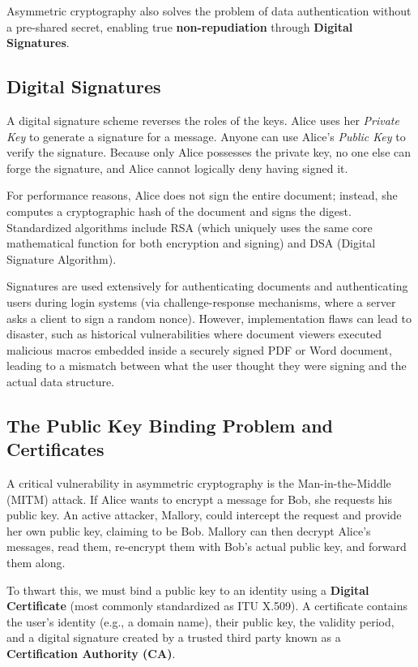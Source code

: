 Asymmetric cryptography also solves the problem of data authentication without a pre-shared secret, enabling true \textbf{non-repudiation} through \textbf{Digital Signatures}. 

\subsection{Digital Signatures}
A digital signature scheme reverses the roles of the keys. Alice uses her \textit{Private Key} to generate a signature for a message. Anyone can use Alice's \textit{Public Key} to verify the signature. Because only Alice possesses the private key, no one else can forge the signature, and Alice cannot logically deny having signed it.

For performance reasons, Alice does not sign the entire document; instead, she computes a cryptographic hash of the document and signs the digest. Standardized algorithms include RSA (which uniquely uses the same core mathematical function for both encryption and signing) and DSA (Digital Signature Algorithm). 

Signatures are used extensively for authenticating documents and authenticating users during login systems (via challenge-response mechanisms, where a server asks a client to sign a random nonce). However, implementation flaws can lead to disaster, such as historical vulnerabilities where document viewers executed malicious macros embedded inside a securely signed PDF or Word document, leading to a mismatch between what the user thought they were signing and the actual data structure.

\subsection{The Public Key Binding Problem and Certificates}
A critical vulnerability in asymmetric cryptography is the Man-in-the-Middle (MITM) attack. If Alice wants to encrypt a message for Bob, she requests his public key. An active attacker, Mallory, could intercept the request and provide her own public key, claiming to be Bob. Mallory can then decrypt Alice's messages, read them, re-encrypt them with Bob's actual public key, and forward them along.

To thwart this, we must bind a public key to an identity using a \textbf{Digital Certificate} (most commonly standardized as ITU X.509). A certificate contains the user's identity (e.g., a domain name), their public key, the validity period, and a digital signature created by a trusted third party known as a \textbf{Certification Authority (CA)}.

